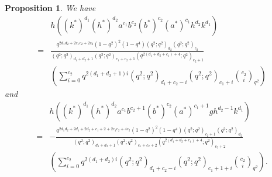 \documentclass[table,a4paper,reqno]{amsart}
\numberwithin{equation}{section}
\newtheorem{proposition}[theorem]{Proposition}
\theoremstyle{definition}
\begin{document}
\begin{proposition}\label{prop:5.4}
We have
    \begin{equation}\label{eq:5.38}
            \begin{split}
                &h\left((k^*)^{d_1}(h^*)^{d_2}a^{c_1}b^{c_2}(b^*)^{c_2}(a^*)^{c_1}h^{d_2}k^{d_1}\right)\\
                =&\frac{q^{2d_1d_2+2c_1c_2+2c_2}(1-q^2)^2(1-q^4)(q^2;q^2)_{d_2}(q^2;q^2)_{c_2}}{(q^2;q^2)_{d_1+d_2+1}(q^2;q^2)_{c_1+c_2+1}(q^{2(d_1+d_2+c_1)+4};q^2)_{c_2+1}}\\
                &\left(\sum_{i=0}^{c_2}q^{2(d_1+d_2+1)i}(q^2;q^2)_{d_1+c_2-i}(q^2;q^2)_{c_1+i}{c_2\choose i}_{q^2}\right)
                \end{split}
            \end{equation} 
         and   
       \begin{equation}\label{eq:5.39}
            \begin{split}
                &h\left((k^*)^{d_1}(h^*)^{d_2}a^{c_1}b^{c_2+1}(b^*)^{c_2}(a^*)^{c_1+1}gh^{d_2-1}k^{d_1}\right)\\
                =&-\frac{q^{2d_1d_2+2d_1+2d_2+c_1+2+2c_1c_2+4c_2}(1-q^2)^2(1-q^4)(q^2;q^2)_{c_2+1}(q^2;q^2)_{d_2}}{(q^2;q^2)_{d_1+d_2+1}(q^2;q^2)_{c_1+c_2+2}(q^{2(d_1+d_2+c_1)+4};q^2)_{c_2+2}}\\
                &\left(\sum_{i=0}^{c_2}q^{2(d_1+d_2)i}(q^2;q^2)_{d_1+c_2-i}(q^2;q^2)_{c_1+1+i}{c_2\choose i}_{q^2}\right).
            \end{split}
        \end{equation}
\end{proposition}
\end{document}
